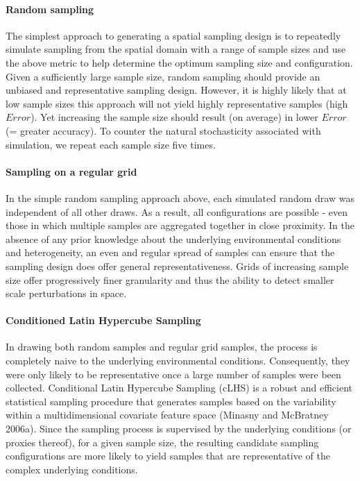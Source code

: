 \documentclass[a4paper]{article}
\begin{document}
\hypertarget{random-sampling}{%
\paragraph{Random sampling}\label{random-sampling}}

The simplest approach to generating a spatial sampling design is to
repeatedly simulate sampling from the spatial domain with a range of
sample sizes and use the above metric to help determine the optimum
sampling size and configuration. Given a sufficiently large sample size,
random sampling should provide an unbiased and representative sampling
design. However, it is highly likely that at low sample sizes this
approach will not yield highly representative samples (high \(Error\)).
Yet increasing the sample size should result (on average) in lower
\(Error\) (= greater accuracy). To counter the natural stochasticity
associated with simulation, we repeat each sample size five times.

\hypertarget{sampling-on-a-regular-grid}{%
\paragraph{Sampling on a regular
grid}\label{sampling-on-a-regular-grid}}

In the simple random sampling approach above, each simulated random draw
was independent of all other draws. As a result, all configurations are
possible - even those in which multiple samples are aggregated together
in close proximity. In the absence of any prior knowledge about the
underlying environmental conditions and heterogeneity, an even and
regular spread of samples can ensure that the sampling design does offer
general representativeness. Grids of increasing sample size offer
progressively finer granularity and thus the ability to detect smaller
scale perturbations in space.

\hypertarget{conditioned-latin-hypercube-sampling}{%
\paragraph{Conditioned Latin Hypercube
Sampling}\label{conditioned-latin-hypercube-sampling}}

In drawing both random samples and regular grid samples, the process is
completely naive to the underlying environmental conditions.
Consequently, they were only likely to be representative once a large
number of samples were been collected. Conditional Latin Hypercube
Sampling (cLHS) is a robust and efficient statistical sampling procedure
that generates samples based on the variability within a
multidimensional covariate feature space (Minasny and McBratney 2006a).
Since the sampling process is supervised by the underlying conditions
(or proxies thereof), for a given sample size, the resulting candidate
sampling configurations are more likely to yield samples that are
representative of the complex underlying conditions.
\end{document}
